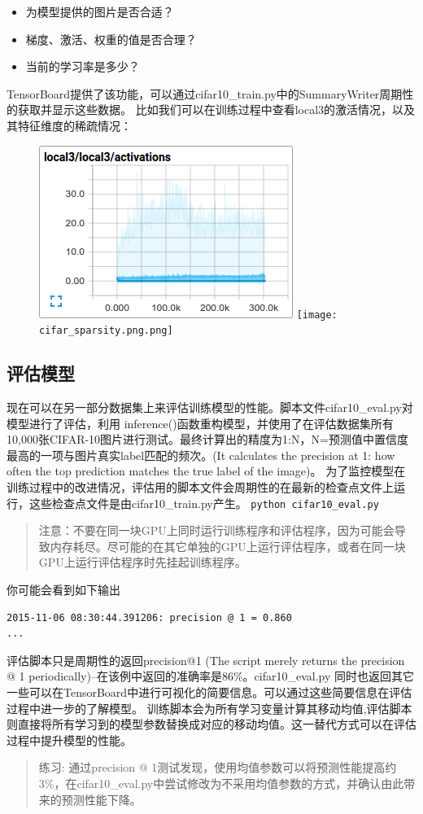 \documentclass[11pt,fleqn]{book}
\begin{document}
{\begin{itemize}
\item 为模型提供的图片是否合适？
\item 梯度、激活、权重的值是否合理？
\item 当前的学习率是多少？
\end{itemize}
TensorBoard提供了该功能，可以通过cifar10\_train.py中的SummaryWriter周期性的获取并显示这些数据。
比如我们可以在训练过程中查看local3的激活情况，以及其特征维度的稀疏情况：
\begin{figure}[H]
\centering
\includegraphics[scale=0.5]{cifar_activations.png}
\texttt{[image: cifar\_sparsity.png.png]}
\end{figure}
\subsection{评估模型}
现在可以在另一部分数据集上来评估训练模型的性能。脚本文件cifar10\_eval.py对模型进行了评估，利用 inference()函数重构模型，并使用了在评估数据集所有10,000张CIFAR-10图片进行测试。最终计算出的精度为1:N，N=预测值中置信度最高的一项与图片真实label匹配的频次。(It calculates the precision at 1: how often the top prediction matches the true label of the image)。
为了监控模型在训练过程中的改进情况，评估用的脚本文件会周期性的在最新的检查点文件上运行，这些检查点文件是由cifar10\_train.py产生。
\lstinline[language=Bash]{python cifar10_eval.py}
\begin{quote}
注意：不要在同一块GPU上同时运行训练程序和评估程序，因为可能会导致内存耗尽。尽可能的在其它单独的GPU上运行评估程序，或者在同一块GPU上运行评估程序时先挂起训练程序。
\end{quote}
你可能会看到如下输出
\begin{lstlisting}[language=Bash]
2015-11-06 08:30:44.391206: precision @ 1 = 0.860
...
\end{lstlisting}
评估脚本只是周期性的返回precision@1 (The script merely returns the precision @ 1 periodically)--在该例中返回的准确率是86\%。cifar10\_eval.py 同时也返回其它一些可以在TensorBoard中进行可视化的简要信息。可以通过这些简要信息在评估过程中进一步的了解模型。
训练脚本会为所有学习变量计算其移动均值,评估脚本则直接将所有学习到的模型参数替换成对应的移动均值。这一替代方式可以在评估过程中提升模型的性能。
\begin{quote}
练习: 通过precision @ 1测试发现，使用均值参数可以将预测性能提高约3\%，在cifar10\_eval.py中尝试修改为不采用均值参数的方式，并确认由此带来的预测性能下降。
\end{quote}
}
\end{document}
